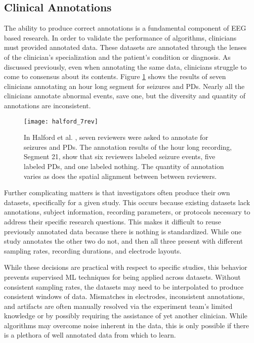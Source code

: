 \subsection{Clinical Annotations}

The ability to produce correct annotations is a fundamental component of \ac{EEG} based research. In order to validate the performance of algorithms, clinicians must provided annotated data. These datasets are annotated through the lenses of the clinician's specialization and the patient's condition or diagnosis. As discussed previously, even when annotating the same data, clinicians struggle to come to consensus about its contents. Figure \ref{fig:halford_anno} shows the results of seven clinicians annotating an hour long segment for seizures and \acp{PD}. Nearly all the clinicians annotate abnormal events, save one, but the diversity and quantity of annotations are inconsistent.

\begin{figure}
\centering
\texttt{[image: halford\_7rev]}
\caption[Example of EEG]{In Halford et al. \cite{Halford2015}, seven reviewers were asked to annotate for seizures and \acp{PD}. The annotation results of the hour long recording, Segment 21, show that six reviewers labeled seizure events, five labeled \acp{PD}, and one labeled nothing. The quantity of annotation varies as does the spatial alignment between between reviewers.}
\label{fig:halford_anno}
\end{figure}

Further complicating matters is that investigators often produce their own datasets, specifically for a given study. This occurs because existing datasets lack annotations, subject information, recording parameters, or protocols necessary to address their specific research questions. This makes it difficult to reuse previously annotated data because there is nothing is standardized. While one study annotates the other two do not, and then all three present with different sampling rates, recording durations, and electrode layouts.

While these decisions are practical with respect to specific studies, this behavior prevents supervised \ac{ML} techniques for being applied across datasets. Without consistent sampling rates, the datasets may need to be interpolated to produce consistent windows of data. Mismatches in electrodes, inconsistent annotations, and artifacts are often manually resolved via the experiment team's limited knowledge or by possibly requiring the assistance of yet another clinician. While algorithms may overcome noise inherent in the data, this is only possible if there is a plethora of well annotated data from which to learn.

